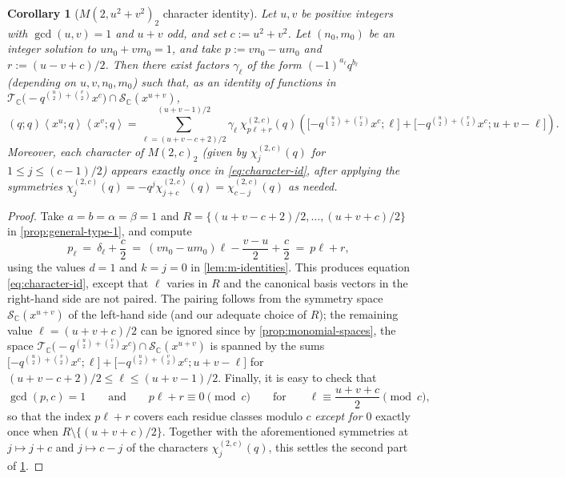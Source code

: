 \documentclass[reqno,11pt]{amsart}
\newtheorem{corollary}[theorem]{Corollary}
\theoremstyle{definition}
\theoremstyle{remark}
\numberwithin{equation}{section}
\newcommand{\C}{\mathbb{C}}
\newcommand{\mT}{\mathcal{T}}
\newcommand{\mS}{\mathcal{S}}
\newcommand{\la}{\left\langle}
\newcommand{\ra}{\right\rangle}
\newcommand{\vect}[2]{\big[{#1};{#2}\big]}
\begin{document}
\begin{corollary}[$M(2, u^2+v^2)_2$ character identity]\label{cor:character-identity}
Let $u, v$ be positive integers with $\gcd(u, v) = 1$ and $u + v$ odd, and set $c := u^2 + v^2$. Let $(n_0, m_0)$ be an integer solution to $un_0 + vm_0 = 1$, and take $p := v n_0 - u m_0$ and $r := (u-v+c)/2$. Then there exist factors $\gamma_\ell$ of the form $(-1)^{a_\ell} q^{b_\ell}$ (depending on $u, v, n_0, m_0$) such that, as an identity of functions in $\mT_\C\big(-q^{\binom{u}{2} + \binom{v}{2}} x^c\big) \cap \mS_\C\left(x^{u+v}\right)$,
\begin{equation} \label{eq:character-id}
    (q; q)\la x^u; q \ra \la x^v; q \ra
    =
    \sum_{\ell = (u+v-c+2)/2}^{(u+v-1)/2} 
    \gamma_\ell\ \chi_{p\ell + r}^{(2, c)}(q)
    \left( \vect{-q^{\binom{u}{2} + \binom{v}{2}} x^{c}}{\ell} + \vect{-q^{\binom{u}{2} + \binom{v}{2}} x^{c}}{u+v-\ell} \right).
\end{equation}
Moreover, each character of $M(2, c)_2$ (given by $\chi_j^{(2,c)}(q)$ for $1 \le j \le (c-1)/2$) appears exactly once in \cref{eq:character-id}, after applying the symmetries $\chi_{j}^{(2,c)}(q) = -q^j \chi_{j+c}^{(2,c)}(q) = \chi_{c-j}^{(2,c)}(q)$ as needed.
\end{corollary}
\begin{proof}
Take $a = b = \alpha = \beta = 1$ and $R = \{(u+v-c+2)/2, \ldots, (u+v+c)/2\}$ in \cref{prop:general-type-1}, and compute
\[
    p_\ell \ =\ \delta_\ell + \frac{c}{2} 
    \ =\ (vn_0 - um_0)\ell - \frac{v-u}{2} + \frac{c}{2} 
    \ =\ p \ell + r,
\]
using the values $d = 1$ and $k = j = 0$ in \cref{lem:m-identities}. This produces equation \cref{eq:character-id}, except that $\ell$ varies in $R$ and the canonical basis vectors in the right-hand side are not paired. The pairing follows from the symmetry space $\mS_\C\left(x^{u+v}\right)$ of the left-hand side (and our adequate choice of $R$); the remaining value $\ell = (u+v+c)/2$ can be ignored since by \cref{prop:monomial-spaces}, the space $\mT_\C\big(-q^{\binom{u}{2} + \binom{v}{2}} x^c\big) \cap \mS_\C\left(x^{u+v}\right)$ is spanned by the sums $\vect{-q^{\binom{u}{2} + \binom{v}{2}} x^{c}}{\ell} + \vect{-q^{\binom{u}{2} + \binom{v}{2}} x^{c}}{u+v-\ell}$ for $(u+v-c+2)/2 \le \ell \le (u+v-1)/2$. Finally, it is easy to check that
\[
    \gcd(p, c) = 1 \qquad\text{and}\qquad p \ell + r \equiv 0 \pmod{c}
    \qquad \text{for} \qquad 
    \ell \equiv \frac{u+v+c}{2} \pmod{c},
\]
so that the index $p\ell+r$ covers each residue classes modulo $c$ \emph{except for $0$} exactly once when $R \setminus \{(u+v+c)/2\}$. Together with the aforementioned symmetries at $j \mapsto j+c$ and $j \mapsto c-j$ of the characters $\chi^{(2,c)}_{j}(q)$, this settles the second part of \cref{cor:character-identity}.
\end{proof}
\end{document}
